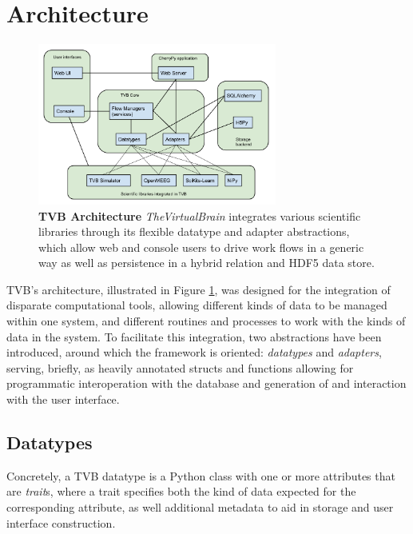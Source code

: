 \documentclass{bioinfo}
\newcommand{\TVB}{\textit{TheVirtualBrain }}
\begin{document}
\section{Architecture}

\begin{figure}
	\centering
	\includegraphics[width=0.7\textwidth]{images/arch.png}
	\caption{\textbf{TVB Architecture} \TVB integrates various scientific 
		libraries through its flexible datatype and adapter abstractions, 
		which allow web and console users to drive work flows in a 
		generic way as well as persistence in a hybrid relation and 
		HDF5 data store.}
	\label{fig:architecture}
\end{figure}

TVB's architecture, illustrated in Figure \ref{fig:architecture}, was designed 
for the integration of disparate computational
tools, allowing different kinds of data to be managed within one system, and
different routines and processes to work with the kinds of data in the system.
To facilitate this integration, two abstractions have been introduced, around
which the framework is oriented: \textit{datatypes} and \textit{adapters},
serving, briefly, as heavily annotated structs and functions allowing for
programmatic interoperation with the database and generation of and interaction
with the user interface. 

\subsection{Datatypes}

Concretely, a TVB datatype is a Python class with one or more attributes 
that are \textit{trait}s, where a trait specifies both the kind of data
expected for the corresponding attribute, as well additional metadata to
aid in storage and user interface construction. 
\end{document}
